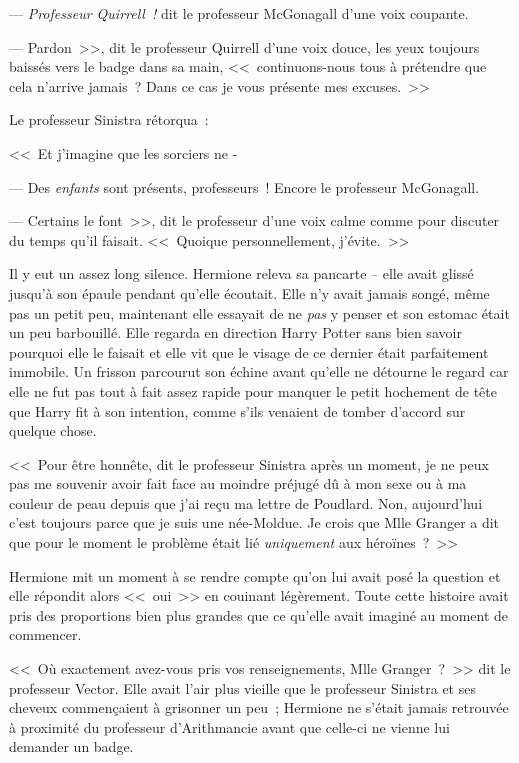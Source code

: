 --- \emph{Professeur Quirrell~!} dit le professeur McGonagall d'une voix coupante.

--- Pardon~>>, dit le professeur Quirrell d'une voix douce, les yeux toujours baissés vers le badge dans sa main, <<~continuons-nous tous à prétendre que cela n'arrive jamais~? Dans ce cas je vous présente mes excuses.~>>

Le professeur Sinistra rétorqua~:

<<~Et j'imagine que les sorciers ne -

--- Des \emph{enfants} sont présents, professeurs~! Encore le professeur McGonagall.

--- Certains le font~>>, dit le professeur d'une voix calme comme pour discuter du temps qu'il faisait. <<~Quoique personnellement, j'évite.~>>

Il y eut un assez long silence. Hermione releva sa pancarte -- elle avait glissé jusqu'à son épaule pendant qu'elle écoutait. Elle n'y avait jamais songé, même pas un petit peu, maintenant elle essayait de ne \emph{pas} y penser et son estomac était un peu barbouillé. Elle regarda en direction Harry Potter sans bien savoir pourquoi elle le faisait et elle vit que le visage de ce dernier était parfaitement immobile. Un frisson parcourut son échine avant qu'elle ne détourne le regard car elle ne fut pas tout à fait assez rapide pour manquer le petit hochement de tête que Harry fit à son intention, comme s'ils venaient de tomber d'accord sur quelque chose.

<<~Pour être honnête, dit le professeur Sinistra après un moment, je ne peux pas me souvenir avoir fait face au moindre préjugé dû à mon sexe ou à ma couleur de peau depuis que j'ai reçu ma lettre de Poudlard. Non, aujourd'hui c'est toujours parce que je suis une née-Moldue. Je crois que Mlle Granger a dit que pour le moment le problème était lié \emph{uniquement} aux héroïnes~?~>>

Hermione mit un moment à se rendre compte qu'on lui avait posé la question et elle répondit alors <<~oui~>> en couinant légèrement. Toute cette histoire avait pris des proportions bien plus grandes que ce qu'elle avait imaginé au moment de commencer.

<<~Où exactement avez-vous pris vos renseignements, Mlle Granger~?~>> dit le professeur Vector. Elle avait l'air plus vieille que le professeur Sinistra et ses cheveux commençaient à grisonner un peu~; Hermione ne s'était jamais retrouvée à proximité du professeur d'Arithmancie avant que celle-ci ne vienne lui demander un badge.

